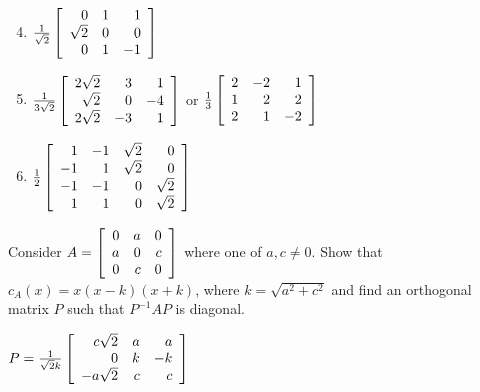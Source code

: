 \begin{multicols}{2}
\begin{ex}
\begin{sol}
\begin{enumerate}[label={\alph*.}]
\setcounter{enumi}{3}
\item  $\tfrac{1}{\sqrt{2}}\left[ \begin{array}{rrr}
0 & 1 & 1\\
\sqrt{2} & 0 & 0\\
0 & 1 & -1
\end{array}\right]$

\setcounter{enumi}{5}
\item  $\tfrac{1}{3\sqrt{2}}\left[ \begin{array}{rrr}
2\sqrt{2} & 3 & 1\\
\sqrt{2} & 0 & -4\\
2\sqrt{2} & -3 & 1
\end{array}\right]$ or $\tfrac{1}{3}\left[ \begin{array}{rrr}
2 & -2 & 1\\
1 & 2 & 2\\
2 & 1 & -2
\end{array}\right]$

\setcounter{enumi}{7}
\item  $\tfrac{1}{2}\left[ \begin{array}{rrrr}
1 & -1 & \sqrt{2} & 0\\
-1 & 1 & \sqrt{2} & 0\\
-1 & -1 & 0 & \sqrt{2}\\
1 & 1 & 0 & \sqrt{2}
\end{array}\right]$

\end{enumerate}
\end{sol}
\end{ex}

\begin{ex}
Consider $A = \left[ \begin{array}{rrr}
0 & a & 0 \\
a & 0 & c \\
0 & c & 0 
\end{array}\right]$
 where one of $a, c \neq 0$. Show that $c_{A}(x) = x(x - k)(x + k)$, where $k = \sqrt{a^2 + c^2}$ and find an orthogonal matrix $P$ such that $P^{-1}AP$ is diagonal.

\begin{sol}
$P = \tfrac{1}{\sqrt{2}k}\left[ \begin{array}{rrr}
c\sqrt{2} & a & a \\
0 & k & -k \\
-a\sqrt{2} & c & c
\end{array}\right]$
\end{sol}
\end{ex}


\end{multicols}
